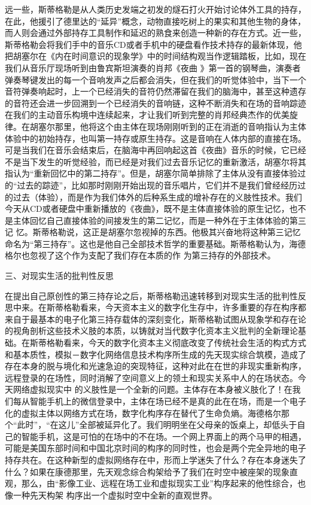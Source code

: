 \documentclass{article}
\begin{document}
远一些，斯蒂格勒是从人类历史发端之初发的燧石打火开始讨论体外工具的持存，在此，他援引了德里达的“延异”概念，动物直接吃树上的果实和其他生物的身体，而人则会通过外部持存工具制作和延迟的熟食来创造一种新的存在方式。近一些，斯蒂格勒会将我们手中的音乐CD或者手机中的硬盘看作技术持存的最新体现，他把胡塞尔在《内在时间意识的现象学》中的时间结构观当作逻辑踏板，比如，现在我们从音乐厅现场听到由鲁宾斯坦演奏的肖邦《夜曲
\newpage
》第一首的钢琴曲，演奏者弹奏琴键发出的每一个音响发声之后都会消失，但在我们的听觉体验中，当下一个音符弹奏响起时，上一个已经消失的音符仍然滞留在我们的脑海中，甚至这种遗存的音符还会进一步回溯到一个已经消失的音响链，这种不断消失和在场的音响踪迹在我们的主动音乐构境中连续起来，才让我们听到完整的肖邦经典杰作的优美旋律。在胡塞尔那里，他将这个由主体在现场刚刚听到的正在消逝的音响指认为主体体验中的初始持存，也叫第一持存或原生持存。这是音响在人体内部的直接在场。可是当我们在音乐会结束后，在脑海中再回响起这首《夜曲》音乐的时候，它已经不是当下发生的听觉经验，而已经是对我们过去音乐记忆的重新激活，胡塞尔将其指认为“重新回忆中的第二持存”。但是，胡塞尔简单排除了主体从没有直接体验过的“过去的踪迹”，比如那时刚刚开始出现的音乐唱片，它们并不是我们曾经经历过的过去（体验），而是作为我们体外的后种系生成的增补存在的义肢性技术。我们今天从CD或者硬盘中重新播放的《夜曲》，既不是主体直接体验的原生记忆，也不是主体回忆自己直接体验的间接发生的第二记忆，而是一种外在于主体体验的第三记
\newpage
忆。斯蒂格勒说，这正是胡塞尔忽视掉的东西。他极其兴奋地将这种第三记忆命名为“第三持存”。这也是他自己全部技术哲学的重要基础。斯蒂格勒认为，海德格尔也忽视了这个作为支配了我们存在本质的作
为第三持存的外部技术。 


三、对现实生活的批判性反思 

在提出自己原创性的第三持存论之后，斯蒂格勒迅速转移到对现实生活的批判性反思中来。在斯蒂格勒看来，今天资本主义的数字化生存中，许多重要的存在构序都来自于最基本的电子化第三持存载体的深刻变化，斯蒂格勒试图从现象学和存在论的视角剖析这些技术义肢的本质，以铸就对当代数字化资本主义批判的全新理论基础。在斯蒂格勒看来，今天的数字化资本主义彻底改变了传统社会生活的构式方式和基本质性，模拟－数字化网络信息技术构序所生成的先天现实综合筑模，造成了存在本身的脱与境化和光速急迫的突现特征，这种对此在在世的非现实重新构序，远程登录的在场性，同时消解了空间意义上的领土和现实关系中人的在场状态。今天网络虚拟现实中
\newpage
的义肢性是一个全新的问题。主体存在本身被义肢化了！在我们每从智能手机上的微信登录中，主体在场已经不是真的此在在场，而是一个电子化的虚拟主体以网络方式在场，数字化构序存在替代了生命负熵。海德格尔那个“此时”，“在这儿”全部被延异化了。我们明明坐在父母亲的饭桌上，却低头于自己的智能手机，这是可怕的在场中的不在场。一个网上界面上的两个马甲的相遇，可能是美国东部时间和中国北京时间的构序的同时性，也会是两个完全异地的电子持存共在。在这种新型的虚拟网络存在中，形而上学迷失了什么？存在本身迷失了什么？如果在康德那里，先天观念综合构架给予了我们在时空中被座架的现象直观，那么，由“影像工业、远程在场工业和虚拟现实工业”构序起来的他性综合，也像一种先天构架
构序出一个虚拟时空中全新的直观世界。 
\end{document}
